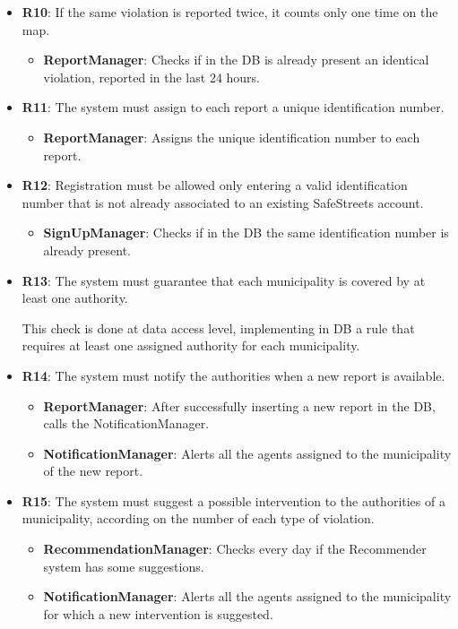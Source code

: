 \documentclass[12pt,a4paper]{report}
\begin{document}
\begin{itemize}
	\item\textbf{R10}: If the same violation is reported twice, it counts only one time on the map.
		\begin{itemize}
		\item\textbf{ReportManager}: Checks if in the DB is already present an identical violation, reported in the last 24 hours.
		\end{itemize}
			
	\item\textbf{R11}: The system must assign to each report a unique identification number.
		\begin{itemize}
		\item\textbf{ReportManager}: Assigns the unique identification number to each report.
		\end{itemize}
			
	\item\textbf{R12}: Registration must be allowed only entering a valid identification number that is not already associated to an existing SafeStreets account.
		\begin{itemize}
		\item\textbf{SignUpManager}: Checks if in the DB the same identification number is already present.
		\end{itemize}
			
	\item\textbf{R13}: The system must guarantee that each municipality is covered by at least one authority.

		This check is done at data access level, implementing in DB a rule that requires at least one assigned authority for each municipality.
			
	\item\textbf{R14}: The system must notify the authorities when a new report is available.
		\begin{itemize}
		\item\textbf{ReportManager}: After successfully inserting a new report in the DB, calls the NotificationManager.
		\item\textbf{NotificationManager}: Alerts all the agents assigned to the municipality of the new report.
		\end{itemize}
			
	\item\textbf{R15}: The system must suggest a possible intervention to the authorities of a municipality, according on the number of each type of violation.
		\begin{itemize}
		\item\textbf{RecommendationManager}: Checks every day if the Recommender system has some suggestions.		
		\item\textbf{NotificationManager}: Alerts all the agents assigned to the municipality for which a new intervention is suggested.
		\end{itemize}
			

\end{itemize}
\end{document}
